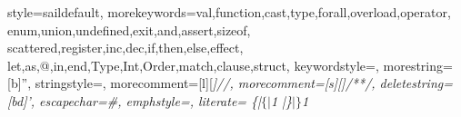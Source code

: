 \usepackage[T1]{fontenc}
\usepackage[scaled=0.82]{beramono}
\usepackage{amssymb}


  {style=saildefault,
   morekeywords={val,function,cast,type,forall,overload,operator,
                 enum,union,undefined,exit,and,assert,sizeof,
                 scattered,register,inc,dec,if,then,else,effect,
                 let,as,@,in,end,Type,Int,Order,match,clause,struct},
   keywordstyle={\bf\ttfamily},
   morestring=[b]'',
   stringstyle={\ttfamily\color{red}},
   morecomment=[l][\itshape\color{DarkGreen}]{//},
   morecomment=[s][\itshape\color{DarkGreen}]{/*}{*/},
   deletestring=[bd]{'},
   escapechar=\#,
   emphstyle={\it},
   literate=
      {\{|}{{$\{|$}}1
      {|\}}{{$|\}$}}1
  }


{
  \newcommand{\saildocfcl}[2]{}
}

\newenvironment{formalspec}
{ \vspace{-0.2in}
  \begin{quotation}
  \noindent
  \small \em
  \rule{\linewidth}{1pt}\\
}
{
  \rule{\linewidth}{1pt}
  \end{quotation}
  \vspace{-0.2in}
}
